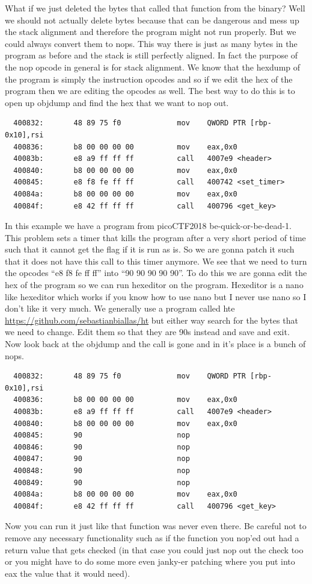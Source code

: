 \documentclass{report}
\begin{document}
What if we just deleted the bytes that called that function from the binary?  Well we should not actually delete bytes because that can be dangerous and mess up the stack alignment and therefore the program might not run properly.  But we could always convert them to nops.  This way there is just as many bytes in the program as before and the stack is still perfectly aligned.  In fact the purpose of the nop opcode in general is for stack alignment.  We know that the hexdump of the program is simply the instruction opcodes and so if we edit the hex of the program then we are editing the opcodes as well.  The best way to do this is to open up objdump and find the hex that we want to nop out.
\begin{lstlisting}
  400832:       48 89 75 f0             mov    QWORD PTR [rbp-0x10],rsi
  400836:       b8 00 00 00 00          mov    eax,0x0
  40083b:       e8 a9 ff ff ff          call   4007e9 <header>
  400840:       b8 00 00 00 00          mov    eax,0x0
  400845:       e8 f8 fe ff ff          call   400742 <set_timer>
  40084a:       b8 00 00 00 00          mov    eax,0x0
  40084f:       e8 42 ff ff ff          call   400796 <get_key>
\end{lstlisting}
In this example we have a program from picoCTF2018 be-quick-or-be-dead-1.  This problem sets a timer that kills the program after a very short period of time such that it cannot get the flag if it is run as is.  So we are gonna patch it such that it does not have this call to this timer anymore.  We see that we need to turn the opcodes ``e8 f8 fe ff ff'' into ``90 90 90 90 90''.  To do this we are gonna edit the hex of the program so we can run hexeditor on the program.  Hexeditor is a nano like hexeditor which works if you know how to use nano but I never use nano so I don't like it very much.
We generally use a program called hte \url{https://github.com/sebastianbiallas/ht} but either way search for the bytes that we need to change.  Edit them so that they are 90s instead and save and exit.  Now look back at the objdump and the call is gone and in it's place is a bunch of nops.
\begin{lstlisting}
  400832:       48 89 75 f0             mov    QWORD PTR [rbp-0x10],rsi
  400836:       b8 00 00 00 00          mov    eax,0x0
  40083b:       e8 a9 ff ff ff          call   4007e9 <header>
  400840:       b8 00 00 00 00          mov    eax,0x0
  400845:       90                      nop
  400846:       90                      nop
  400847:       90                      nop
  400848:       90                      nop
  400849:       90                      nop
  40084a:       b8 00 00 00 00          mov    eax,0x0
  40084f:       e8 42 ff ff ff          call   400796 <get_key>
\end{lstlisting}
Now you can run it just like that function was never even there.  Be careful not to remove any necessary functionality such as if the function you nop'ed out had a return value that gets checked (in that case you could just nop out the check too or you might have to do some more even janky-er patching where you put into eax the value that it would need).
\end{document}
